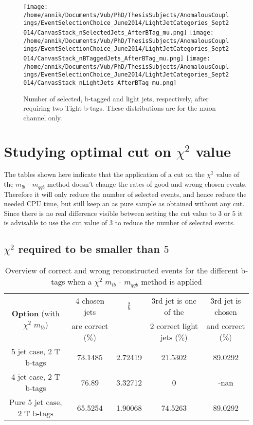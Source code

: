 \begin{figure}[!h]
\texttt{[image: /home/annik/Documents/Vub/PhD/ThesisSubjects/AnomalousCouplings/EventSelectionChoice\_June2014/LightJetCategories\_Sept2014/CanvasStack\_nSelectedJets\_AfterBTag\_mu.png]}
\texttt{[image: /home/annik/Documents/Vub/PhD/ThesisSubjects/AnomalousCouplings/EventSelectionChoice\_June2014/LightJetCategories\_Sept2014/CanvasStack\_nBTaggedJets\_AfterBTag\_mu.png]}
\texttt{[image: /home/annik/Documents/Vub/PhD/ThesisSubjects/AnomalousCouplings/EventSelectionChoice\_June2014/LightJetCategories\_Sept2014/CanvasStack\_nLightJets\_AfterBTag\_mu.png]}
\caption{Number of selected, b-tagged and light jets, respectively, after requiring two Tight b-tags. These distributions are for the muon channel only.}
\end{figure}

 
\section{Studying optimal cut on $\chi^{2}$ value}
The tables shown here indicate that the application of a cut on the $\chi^{2}$ value of the $m_{lb}$ - $m_{qqb}$ method doesn't change the rates of good and wrong chosen events. Therefore it will only reduce the number of selected events, and hence reduce the needed CPU time, but still keep an as pure sample as obtained without any cut.\\
Since there is no real difference visible between setting the cut value to $3$ or $5$ it is advisable to use the cut value of $3$ to reduce the number of selected events.
 
\subsection{$\chi^{2}$ required to be smaller than $5$}
  \begin{table}[!h] 
 \begin{tabular}{c|c|c|c|c} 
\multirow{2}{*}{\textbf{Option} (with $\chi^{2}$ $m_{lb}$)} & 4 chosen jets & $\frac{s}{b}$ & 3rd jet is one of the & 3rd jet is chosen \\ & are correct ($\%$)    & 	             & 2 correct light jets ($\%$) &  and correct ($\%$)	  \\ \hline 
 5 jet case,      2 T b-tags              & 73.1485 & 2.72419 & 21.5302 & 89.0292 \\ 
 4 jet case,      2 T b-tags              & 76.89 & 3.32712 & 0 & -nan \\ 
 Pure 5 jet case, 2 T b-tags              & 65.5254 & 1.90068 & 74.5263 & 89.0292 \\ 
 \end{tabular} 
 \caption{Overview of correct and wrong reconstructed events for the different b-tags when a $\chi^{2}$ $m_{lb}$ - $m_{qqb}$ method is applied} 
 \end{table} 
 
